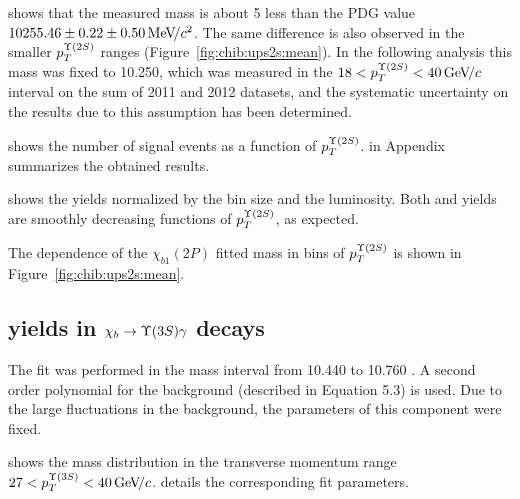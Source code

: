 


 shows that the measured \chiboneTwoP mass is
about 5 \mevcc less than the PDG value $10255.46  \pm 0.22 \pm 0.50 {\mathrm{\,Me\kern -0.1em V\!/}c^2}$.
The same difference is also observed in the smaller $p_T^{\Y2S}$ ranges
(Figure~\ref{fig:chib:ups2s:mean}).
In the following analysis this mass was fixed to 10.250\gevcc, which was measured
in the $18 < p_T^{\Y2S} < 40 \gevc$ interval on the sum of 2011 and 2012 datasets, and the
systematic uncertainty on the results due to this assumption has been
determined.



 shows the number of signal events as a function
of $p_T^{\Y2S}$.  in Appendix summarizes the
obtained results.



 shows the yields normalized by the bin
size and the luminosity. Both \chibTwoP and \chibThreeP yields are smoothly
decreasing functions of $p_T^{\Y2S}$, as expected.

The dependence of the $\chi_{b1}(2P)$ fitted mass in bins of $p_T^{\Y2S}$ is
shown in Figure~\ref{fig:chib:ups2s:mean}.


\subsection{\texorpdfstring{\chib}{xb} yields in
    \texorpdfstring{$\chib \to \Y3S \gamma$}{xb --> Y(3S) gamma} decays}
\label{sec:chib:ups3s:fit}

The fit was performed in the mass interval from  10.440 to 10.760 \gevcc. 
A second order polynomial for the background (described in Equation 5.3) is used.
Due to the large fluctuations in the background, the
parameters of this component were fixed.


 shows the mass distribution in the
transverse momentum range $27<p_T^{\Y3S}<40\gevc$.
 details the corresponding fit parameters.




